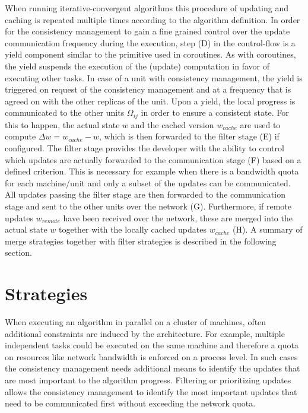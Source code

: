 When running iterative-convergent algorithms this procedure of updating and caching is repeated multiple times according to the algorithm definition.
In order for the consistency management to gain a fine grained control over the update communication frequency during the execution, step (D) in the control-flow is a yield component similar to the primitive used in coroutines.
As with coroutines, the yield suspends the execution of the (update) computation in favor of executing other tasks.
In case of a unit with consistency management, the yield is triggered on request of the consistency management and at a frequency that is agreed on with the other replicas of the unit.
Upon a yield, the local progress is communicated to the other units $\Omega_{ij}$ in order to ensure a consistent state.
For this to happen, the actual state $w$ and the cached version $w_{cache}$ are used to compute $\Delta w = w_{cache} - w$, which is then forwarded to the filter stage (E) if configured.
The filter stage provides the developer with the ability to control which updates are actually forwarded to the communication stage (F) based on a defined criterion.
This is necessary for example when there is a bandwidth quota for each machine/unit and only a subset of the updates can be communicated.
All updates passing the filter stage are then forwarded to the communication stage and sent to the other units over the network (G).
Furthermore, if remote updates $w_{remote}$ have been received over the network, these are merged into the actual state $w$ together with the locally cached updates $w_{cache}$ (H).
A summary of merge strategies together with filter strategies is described in the following section.


\section{Strategies}
When executing an algorithm in parallel on a cluster of machines, often additional constraints are induced by the architecture.
For example, multiple independent tasks could be executed on the same machine and therefore a quota on resources like network bandwidth is enforced on a process level.
In such cases the consistency management needs additional means to identify the updates that are most important to the algorithm progress.
Filtering or prioritizing updates allows the consistency management to identify the most important updates that need to be communicated first without exceeding the network quota.

